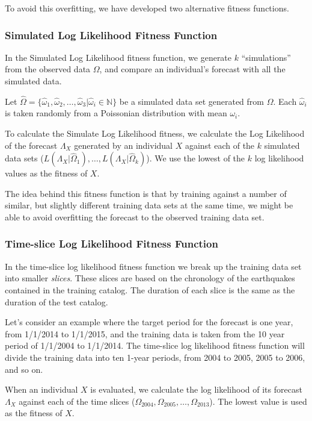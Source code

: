 \documentclass{sig-alternate}
\begin{document}
To avoid this overfitting, we have developed two alternative fitness
functions.

\subsubsection{Simulated Log Likelihood Fitness Function} %

In the Simulated Log Likelihood fitness function, we generate $k$
``simulations'' from the observed data $\Omega$, and compare an
individual's forecast with all the simulated data.

Let $\hat\Omega =
\{\hat\omega_1,\hat\omega_2,\dots,\hat\omega_3
|\hat\omega_i\in\mathbb{N}\}$ be a simulated data set generated from
$\Omega$. Each $\hat\omega_i$ is taken randomly from a Poissonian
distribution with mean $\omega_i$.

To calculate the Simulate Log Likelihood fitness, we calculate the Log
Likelihood of the forecast $\Lambda_X$ generated by an individual $X$
against each of the $k$ simulated data sets
($L(\Lambda_X|\hat\Omega_1), \dots, L(\Lambda_X|\hat\Omega_k)$). We
use the lowest of the $k$ log likelihood values as the fitness of $X$.

The idea behind this fitness function is that by training against a
number of similar, but slightly different training data sets at the
same time, we might be able to avoid overfitting the forecast to the
observed training data set.

\subsubsection{Time-slice Log Likelihood Fitness Function} %

In the time-slice log likelihood fitness function we break up the
training data set into smaller \emph{slices}. These slices are based
on the chronology of the earthquakes contained in the training
catalog. The duration of each slice is the same as the duration of the
test catalog.

Let's consider an example where the target period for the forecast is
one year, from 1/1/2014 to 1/1/2015, and the training data is taken
from the 10 year period of 1/1/2004 to 1/1/2014. The time-slice log
likelihood fitness function will divide the training data into ten
1-year periods, from 2004 to 2005, 2005 to 2006, and so on. 

When an individual $X$ is evaluated, we calculate the log likelihood
of its forecast $\Lambda_X$ against each of the time slices
($\Omega_{2004}, \Omega_{2005}, \dots, \Omega_{2013}$). The lowest
value is used as the fitness of $X$.
\end{document}
